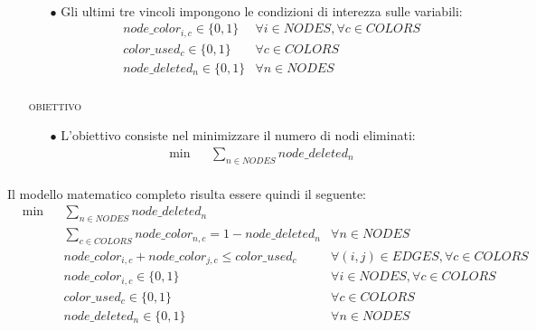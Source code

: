 \documentclass{article}
\begin{document}
\begin{itemize}
\begin{itemize}
\begin{equation*}
\begin{aligned}
	\end{aligned}
	\end{equation*}
	
	\item[$\bullet$] Gli ultimi tre vincoli impongono le condizioni di interezza sulle variabili:\\
	\begin{equation*}
	\begin{aligned}
	& & &  node\_color_{i,c} \in \{0, 1\} & \forall i \in NODES, \forall c \in COLORS\\
	& & &  color\_used_{c} \in \{0, 1\} & \forall c \in COLORS\\
	& & &  node\_deleted_{n} \in \{0, 1\} & \forall n \in NODES\\
	
	\end{aligned}
	\end{equation*}
	
	\end{itemize}

\item[] \textsc{obiettivo} 
	\begin{itemize}
	\item[$\bullet$] L'obiettivo consiste nel minimizzare il numero di nodi eliminati:\\
	\begin{equation*}
	\begin{aligned}
	& {\text{min}} & & \sum\limits_{n \in NODES} node\_deleted_{n} \\
	\end{aligned}
	
	\end{equation*}
	
	\end{itemize}

\end{itemize}

Il modello matematico completo risulta essere quindi il seguente:\\

\begin{equation*}
\begin{aligned}
& {\text{min}} & & \sum\limits_{n \in NODES} node\_deleted_{n} \\
& & &  \sum\limits_{c \in COLORS} node\_color_{n,c} = 1 - node\_deleted_{n} & \forall n \in NODES\\ 
& & &  node\_color_{i,c} + node\_color_{j,c} \le color\_used_{c} & \forall (i,j) \in EDGES, \forall c \in COLORS\\
& & &  node\_color_{i,c} \in \{0, 1\} & \forall i \in NODES, \forall c \in COLORS\\
& & &  color\_used_{c} \in \{0, 1\} & \forall c \in COLORS\\
& & &  node\_deleted_{n} \in \{0, 1\} & \forall n \in NODES\\

\end{aligned}
\end{equation*}
\end{document}
